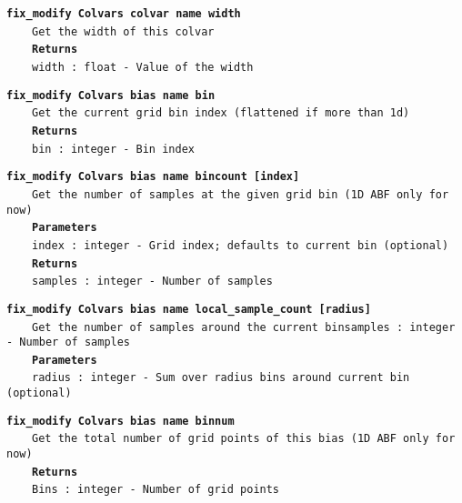 \begin{mdexampleinput}{}
\texttt{\textbf{fix\_modify Colvars colvar name width}}
\\
\-~~~~\texttt{Get the width of this colvar}
\\
\-~~~~\texttt{\textbf{Returns}}
\\
\-~~~~\texttt{width : float - Value of the width}
\end{mdexampleinput}
\begin{mdexampleinput}{}
\texttt{\textbf{fix\_modify Colvars bias name bin}}
\\
\-~~~~\texttt{Get the current grid bin index (flattened if more than 1d)}
\\
\-~~~~\texttt{\textbf{Returns}}
\\
\-~~~~\texttt{bin : integer - Bin index}
\end{mdexampleinput}
\begin{mdexampleinput}{}
\texttt{\textbf{fix\_modify Colvars bias name bincount [index]}}
\\
\-~~~~\texttt{Get the number of samples at the given grid bin (1D ABF only for now)}
\\
\-~~~~\texttt{\textbf{Parameters}}
\\
\-~~~~\texttt{index : integer - Grid index; defaults to current bin (optional)}
\\
\-~~~~\texttt{\textbf{Returns}}
\\
\-~~~~\texttt{samples : integer - Number of samples}
\end{mdexampleinput}
\begin{mdexampleinput}{}
\texttt{\textbf{fix\_modify Colvars bias name local\_sample\_count [radius]}}
\\
\-~~~~\texttt{Get the number of samples around the current binsamples : integer - Number of samples}
\\
\-~~~~\texttt{\textbf{Parameters}}
\\
\-~~~~\texttt{radius : integer - Sum over radius bins around current bin (optional)}
\end{mdexampleinput}
\begin{mdexampleinput}{}
\texttt{\textbf{fix\_modify Colvars bias name binnum}}
\\
\-~~~~\texttt{Get the total number of grid points of this bias (1D ABF only for now)}
\\
\-~~~~\texttt{\textbf{Returns}}
\\
\-~~~~\texttt{Bins : integer - Number of grid points}
\end{mdexampleinput}
